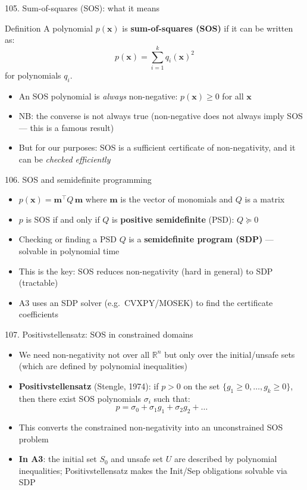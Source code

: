 \documentclass[aspectratio=169]{beamer}
\begin{document}
\begin{frame}{105. Sum-of-squares (SOS): what it means}
\begin{block}{Definition}
A polynomial \(p(\mathbf{x})\) is \textbf{sum-of-squares (SOS)} if it can be written as:
\[p(\mathbf{x}) = \sum_{i=1}^k q_i(\mathbf{x})^2\]
for polynomials \(q_i\).
\end{block}
\begin{itemize}
  \item An SOS polynomial is \emph{always} non-negative: \(p(\mathbf{x}) \ge 0\) for all \(\mathbf{x}\)
  \item NB: the converse is not always true (non-negative does not always imply SOS --- this is a famous result)
  \item But for our purposes: SOS is a sufficient certificate of non-negativity, and it can be \emph{checked efficiently}
\end{itemize}
\end{frame}

\begin{frame}{106. SOS and semidefinite programming}
\begin{itemize}
  \item \(p(\mathbf{x}) = \mathbf{m}^\top Q \, \mathbf{m}\) where \(\mathbf{m}\) is the vector of monomials and \(Q\) is a matrix
  \item \(p\) is SOS if and only if \(Q\) is \textbf{positive semidefinite} (PSD): \(Q \succeq 0\)
  \item Checking or finding a PSD \(Q\) is a \textbf{semidefinite program (SDP)} --- solvable in polynomial time
  \item This is the key: SOS reduces non-negativity (hard in general) to SDP (tractable)
  \item A3 uses an SDP solver (e.g.\ CVXPY/MOSEK) to find the certificate coefficients
\end{itemize}
\end{frame}

\begin{frame}{107. Positivstellensatz: SOS in constrained domains}
\begin{itemize}
  \item We need non-negativity not over all \(\mathbb{R}^n\) but only over the initial/unsafe sets (which are defined by polynomial inequalities)
  \item \textbf{Positivstellensatz} (Stengle, 1974): if \(p > 0\) on the set \(\{g_1 \ge 0, \ldots, g_k \ge 0\}\), then there exist SOS polynomials \(\sigma_i\) such that:
    \[p = \sigma_0 + \sigma_1 g_1 + \sigma_2 g_2 + \ldots\]
  \item This converts the constrained non-negativity into an unconstrained SOS problem
  \item \textbf{In A3}: the initial set \(S_0\) and unsafe set \(U\) are described by polynomial inequalities; Positivstellensatz makes the Init/Sep obligations solvable via SDP
\end{itemize}
\end{frame}
\end{document}
